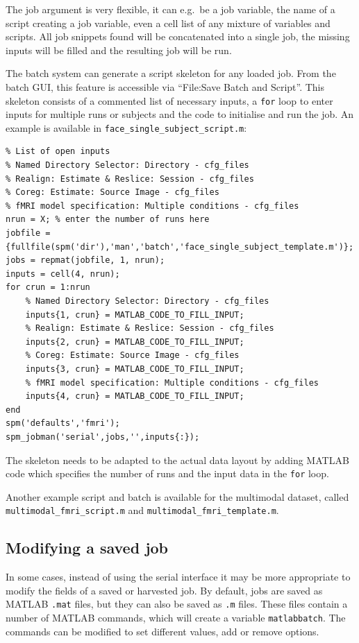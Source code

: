 The job argument is very flexible, it can e.g.\ be a job variable, the
name of a script creating a job variable, even a cell list of any
mixture of variables and scripts. All job snippets found will be
concatenated into a single job, the missing inputs will be filled and
the resulting job will be run.

The batch system can generate a script skeleton for any loaded
job. From the batch GUI, this feature is accessible via ``File:Save
Batch and Script''. This skeleton consists of a commented list of
necessary inputs, a \verb|for| loop to enter inputs for multiple runs
or subjects and the code to initialise and run the job. An example is
available in \verb|face_single_subject_script.m|:

\begin{verbatim}
% List of open inputs
% Named Directory Selector: Directory - cfg_files
% Realign: Estimate & Reslice: Session - cfg_files
% Coreg: Estimate: Source Image - cfg_files
% fMRI model specification: Multiple conditions - cfg_files
nrun = X; % enter the number of runs here
jobfile = {fullfile(spm('dir'),'man','batch','face_single_subject_template.m')};
jobs = repmat(jobfile, 1, nrun);
inputs = cell(4, nrun);
for crun = 1:nrun
    % Named Directory Selector: Directory - cfg_files
    inputs{1, crun} = MATLAB_CODE_TO_FILL_INPUT;
    % Realign: Estimate & Reslice: Session - cfg_files
    inputs{2, crun} = MATLAB_CODE_TO_FILL_INPUT; 
    % Coreg: Estimate: Source Image - cfg_files
    inputs{3, crun} = MATLAB_CODE_TO_FILL_INPUT; 
    % fMRI model specification: Multiple conditions - cfg_files
    inputs{4, crun} = MATLAB_CODE_TO_FILL_INPUT; 
end
spm('defaults','fmri');
spm_jobman('serial',jobs,'',inputs{:});
\end{verbatim}

The skeleton needs to be adapted to the actual data layout by adding
MATLAB code which specifies the number of runs and the input data in
the \verb|for| loop.

Another example script and batch is available for the multimodal
dataset, called \verb|multimodal_fmri_script.m| and
\verb|multimodal_fmri_template.m|.

\subsection{Modifying a saved job}

In some cases, instead of using the serial interface it may be more
appropriate to modify the fields of a saved or harvested job. By default, jobs
are saved as MATLAB \verb|.mat| files, but they can also be saved as
\verb|.m| files. These files contain a number of MATLAB commands,
which will create a variable \verb|matlabbatch|. The commands can be
modified to set different values, add or remove options. 
